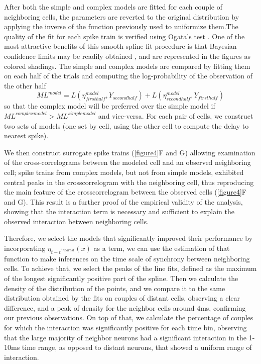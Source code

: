 After both the simple and complex models are fitted for each couple of neighboring cells, the parameters are reverted to the original distribution by applying the inverse of the function previously used to uniformize them.The quality of the fit for each spike train is verified using Ogata’s test \cite{ogata1988statistical}. One of the most attractive benefits of this smooth-spline fit procedure is that Bayesian confidence limits may be readily obtained \cite{wahba1983bayesian}, and are represented in the figures as colored shadings. The simple and complex models are compared by fitting them on each half of the trials and computing the log-probability of the observation of the other half
\begin{equation}
	ML^{model}=L(\eta^{model}_{firsthalf},Y_{secondhalf}) + L(\eta^{model}_{secondhalf},Y_{firsthalf})
\end{equation}
so that the complex model will be preferred over the simple model if $ML^{complexmodel}>ML^{simplemodel}$ and vice-versa. For each pair of cells, we construct two sets of models (one set by cell, using the other cell to compute the delay to nearest spike).

We then construct surrogate spike trains (\ref{figure4}F and G) allowing examination of the cross-correlograms between the modeled cell and an observed neighboring cell; spike trains from complex models, but not from simple models, exhibited central peaks in the crosscorrelogram with the neighboring cell, thus reproducing the main feature of the crosscorrelogram between the observed cells (\ref{figure4}F and G). This result is a further proof of the empirical validity of the analysis, showing that the interaction term is necessary and sufficient to explain the observed interaction between neighboring cells.

Therefore, we select the models that significantly improved their performance by incorporating $\eta_{t-t^{\prime\ nearest}}(x)$ as a term, we can use the estimation of that function to make inferences on the time scale of synchrony between neighboring cells. To achieve that, we select the peaks of the line fits, defined as the maximum of the longest significantly positive part of the spline. Then we calculate the density of the distribution of the points, and we compare it to the same distribution obtained by the fits on couples of distant cells, observing a clear difference, and a peak of density for the neighbor cells around 4ms, confirming our previous observations. On top of that, we calculate the percentage of couples for which the interaction was significantly positive for each time bin, observing that the large majority of neighbor neurons had a significant interaction in the 1-10ms time range, as opposed to distant neurons, that showed a uniform range of interaction.

